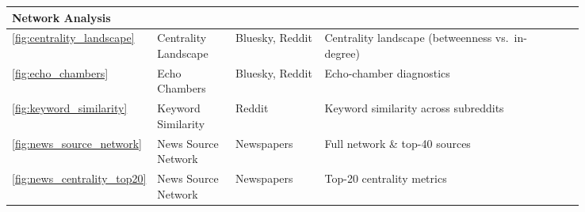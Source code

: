 \begin{longtable}{|p{0.05\linewidth}|p{0.14\linewidth}|p{0.16\linewidth}|p{0.43\linewidth}|p{0.06\linewidth}|}
\multicolumn{5}{|l|}{\rule[-0.3em]{0pt}{1.2em}\textcolor{textprimary}{\sffamily\bfseries\small\enspace 2 \enspace Network Analysis}} \\
\hline
\textcolor{textmuted}{\small\ref{fig:centrality_landscape}}        & \textcolor{textmuted}{\small Centrality Landscape} & \textcolor{textmuted}{\small Bluesky, Reddit} & \textcolor{textmuted}{\small Centrality landscape (betweenness vs.\ in-degree)} & \textcolor{textmuted}{\small\pageref{fig:centrality_landscape}} \\\hline
\textcolor{textmuted}{\small\ref{fig:echo_chambers}}               & \textcolor{textmuted}{\small Echo Chambers}        & \textcolor{textmuted}{\small Bluesky, Reddit} & \textcolor{textmuted}{\small Echo-chamber diagnostics}                 & \textcolor{textmuted}{\small\pageref{fig:echo_chambers}} \\\hline
\textcolor{textmuted}{\small\ref{fig:keyword_similarity}}          & \textcolor{textmuted}{\small Keyword Similarity}   & \textcolor{textmuted}{\small Reddit}          & \textcolor{textmuted}{\small Keyword similarity across subreddits}     & \textcolor{textmuted}{\small\pageref{fig:keyword_similarity}} \\\hline
\textcolor{textmuted}{\small\ref{fig:news_source_network}}         & \textcolor{textmuted}{\small News Source Network}  & \textcolor{textmuted}{\small Newspapers}      & \textcolor{textmuted}{\small Full network \& top-40 sources}           & \textcolor{textmuted}{\small\pageref{fig:news_source_network}} \\\hline
\textcolor{textmuted}{\small\ref{fig:news_centrality_top20}}       & \textcolor{textmuted}{\small News Source Network}  & \textcolor{textmuted}{\small Newspapers}      & \textcolor{textmuted}{\small Top-20 centrality metrics}                & \textcolor{textmuted}{\small\pageref{fig:news_centrality_top20}} \\\hline


\end{longtable}
